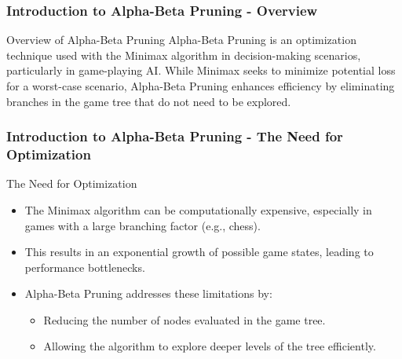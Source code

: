 \documentclass[aspectratio=169]{beamer}
\begin{document}
\begin{frame}[fragile]
    \frametitle{Introduction to Alpha-Beta Pruning - Overview}
    \begin{block}{Overview of Alpha-Beta Pruning}
        Alpha-Beta Pruning is an optimization technique used with the Minimax algorithm in decision-making scenarios, particularly in game-playing AI. 
        While Minimax seeks to minimize potential loss for a worst-case scenario, Alpha-Beta Pruning enhances efficiency by eliminating branches in the game tree that do not need to be explored.
    \end{block}
\end{frame}

\begin{frame}[fragile]
    \frametitle{Introduction to Alpha-Beta Pruning - The Need for Optimization}
    \begin{block}{The Need for Optimization}
        \begin{itemize}
            \item The Minimax algorithm can be computationally expensive, especially in games with a large branching factor (e.g., chess).
            \item This results in an exponential growth of possible game states, leading to performance bottlenecks.
            \item Alpha-Beta Pruning addresses these limitations by:
            \begin{itemize}
                \item Reducing the number of nodes evaluated in the game tree.
                \item Allowing the algorithm to explore deeper levels of the tree efficiently.
            \end{itemize}
        \end{itemize}
    \end{block}
\end{frame}
\end{document}
